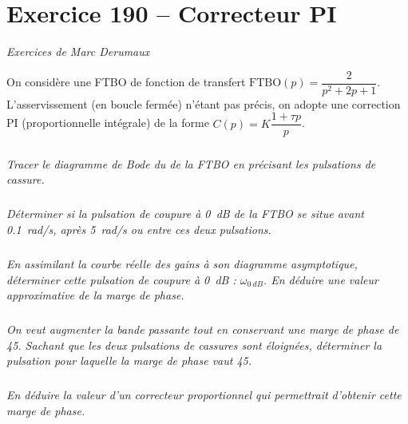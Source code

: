 \section*{Exercice 190 -- Correcteur PI}
\setcounter{exo}{0}

\textit{Exercices de Marc Derumaux}

On considère une FTBO de fonction de transfert $\text{FTBO}(p)= \dfrac{2}{p^2+2p+1}$. L'asservissement (en
boucle fermée) n'étant pas précis, on adopte une correction PI (proportionnelle intégrale) de la
forme $C( p)=K\dfrac{1+\tau p}{p}$.

\subparagraph{}
\textit{Tracer le diagramme de Bode du de la FTBO en précisant les pulsations de cassure.}
\ifprof
\begin{corrige}
\end{corrige}
\else
\fi

\subparagraph{}
\textit{Déterminer si la pulsation de coupure à \SI{0}{dB} de la FTBO se situe avant \SI{0,1}{rad/s}, après \SI{5}{
rad/s} ou entre ces deux pulsations.}
\ifprof
\begin{corrige}
\end{corrige}
\else
\fi

\subparagraph{}
\textit{En assimilant la courbe réelle des gains à son diagramme asymptotique, déterminer cette
pulsation de coupure à \SI{0}{dB} : $\omega_{\SI{0}{dB}}$. En déduire une valeur approximative de la marge de
phase.}
\ifprof
\begin{corrige}
\end{corrige}
\else
\fi

\subparagraph{}
\textit{On veut augmenter la bande passante tout en conservant une marge de phase de 45\degres.
Sachant que les deux pulsations de cassures sont éloignées, déterminer la pulsation pour
laquelle la marge de phase vaut 45\degres.}
\ifprof
\begin{corrige}
\end{corrige}
\else
\fi

\subparagraph{}
\textit{En déduire la valeur d'un correcteur proportionnel qui permettrait d'obtenir cette marge de
phase.}
\ifprof
\begin{corrige}
\end{corrige}
\else
\fi

